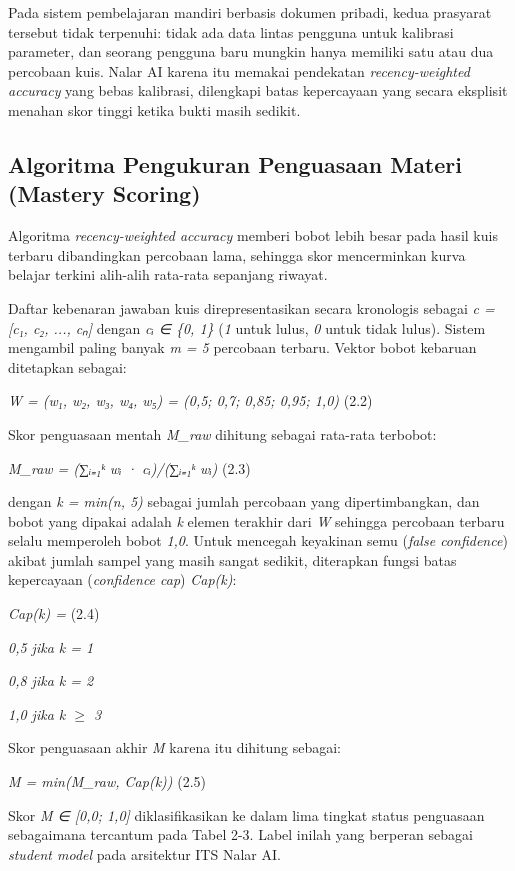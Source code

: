 \documentclass[12pt,a4paper]{article}
\begin{document}
Pada sistem pembelajaran mandiri berbasis dokumen pribadi, kedua prasyarat tersebut tidak terpenuhi: tidak ada data lintas pengguna untuk kalibrasi parameter, dan seorang pengguna baru mungkin hanya memiliki satu atau dua percobaan kuis. Nalar AI karena itu memakai pendekatan \textit{recency-weighted accuracy} yang bebas kalibrasi, dilengkapi batas kepercayaan yang secara eksplisit menahan skor tinggi ketika bukti masih sedikit.

\subsection*{Algoritma Pengukuran Penguasaan Materi (Mastery Scoring)}
Algoritma \textit{recency-weighted accuracy} memberi bobot lebih besar pada hasil kuis terbaru dibandingkan percobaan lama, sehingga skor mencerminkan kurva belajar terkini alih-alih rata-rata sepanjang riwayat.

Daftar kebenaran jawaban kuis direpresentasikan secara kronologis sebagai \textit{c = {[}c₁, c₂, ..., cₙ{]}} dengan \textit{cᵢ ∈ \{0, 1\}} (\textit{1} untuk lulus, \textit{0} untuk tidak lulus). Sistem mengambil paling banyak \textit{m = 5} percobaan terbaru. Vektor bobot kebaruan ditetapkan sebagai:

\textit{W = (w₁, w₂, w₃, w₄, w₅) = (0,5; 0,7; 0,85; 0,95; 1,0)}	(2.2)

Skor penguasaan mentah \textit{M\_raw} dihitung sebagai rata-rata terbobot:

\textit{M\_raw = (∑ᵢ₌₁ᵏ wᵢ · cᵢ)/(∑ᵢ₌₁ᵏ wᵢ)}	(2.3)

dengan \textit{k = min(n, 5)} sebagai jumlah percobaan yang dipertimbangkan, dan bobot yang dipakai adalah \textit{k} elemen terakhir dari \textit{W} sehingga percobaan terbaru selalu memperoleh bobot \textit{1,0}. Untuk mencegah keyakinan semu (\textit{false confidence}) akibat jumlah sampel yang masih sangat sedikit, diterapkan fungsi batas kepercayaan (\textit{confidence cap}) \textit{Cap(k)}:

\textit{Cap(k) =}	(2.4)

\textit{0,5   jika k = 1}

\textit{0,8   jika k = 2}

\textit{1,0   jika k $\ge$ 3}

Skor penguasaan akhir \textit{M} karena itu dihitung sebagai:

\textit{M = min(M\_raw, Cap(k))}	(2.5)

Skor \textit{M ∈ {[}0,0; 1,0{]}} diklasifikasikan ke dalam lima tingkat status penguasaan sebagaimana tercantum pada Tabel 2-3. Label inilah yang berperan sebagai \textit{student model} pada arsitektur ITS Nalar AI.
\end{document}
